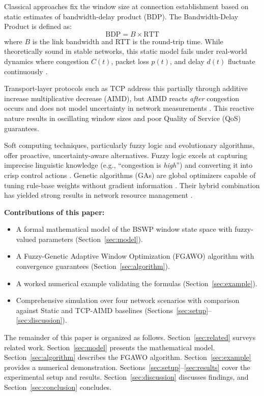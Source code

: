\documentclass[10pt, twocolumn]{IEEEtran}
\theoremstyle{definition}
\begin{document}
Classical approaches fix the window size at connection establishment based on static estimates of bandwidth-delay product (BDP). The Bandwidth-Delay Product is defined as:
\begin{equation}
  \text{BDP} = B \times \text{RTT}
\end{equation}
where $B$ is the link bandwidth and RTT is the round-trip time. While theoretically sound in stable networks, this static model fails under real-world dynamics where congestion $C(t)$, packet loss $p(t)$, and delay $d(t)$ fluctuate continuously \cite{jacobson1988congestion}.

Transport-layer protocols such as TCP address this partially through additive increase multiplicative decrease (AIMD), but AIMD reacts \emph{after} congestion occurs and does not model uncertainty in network measurements \cite{floyd1993random}. This reactive nature results in oscillating window sizes and poor Quality of Service (QoS) guarantees.

Soft computing techniques, particularly fuzzy logic and evolutionary algorithms, offer proactive, uncertainty-aware alternatives. Fuzzy logic excels at capturing imprecise linguistic knowledge (e.g., ``congestion is \emph{high}'') and converting it into crisp control actions \cite{zadeh1965fuzzy}. Genetic algorithms (GAs) are global optimizers capable of tuning rule-base weights without gradient information \cite{goldberg1989genetic}. Their hybrid combination has yielded strong results in network resource management \cite{chen2018fuzzy, kumar2020adaptive}.

\textbf{Contributions of this paper:}
\begin{itemize}
  \item A formal mathematical model of the BSWP window state space with fuzzy-valued parameters (Section~\ref{sec:model}).
  \item A Fuzzy-Genetic Adaptive Window Optimization (FGAWO) algorithm with convergence guarantees (Section~\ref{sec:algorithm}).
  \item A worked numerical example validating the formulas (Section~\ref{sec:example}).
  \item Comprehensive simulation over four network scenarios with comparison against Static and TCP-AIMD baselines (Sections~\ref{sec:setup}--\ref{sec:discussion}).
\end{itemize}

The remainder of this paper is organized as follows. Section~\ref{sec:related} surveys related work. Section~\ref{sec:model} presents the mathematical model. Section~\ref{sec:algorithm} describes the FGAWO algorithm. Section~\ref{sec:example} provides a numerical demonstration. Sections~\ref{sec:setup}--\ref{sec:results} cover the experimental setup and results. Section~\ref{sec:discussion} discusses findings, and Section~\ref{sec:conclusion} concludes.
\end{document}
